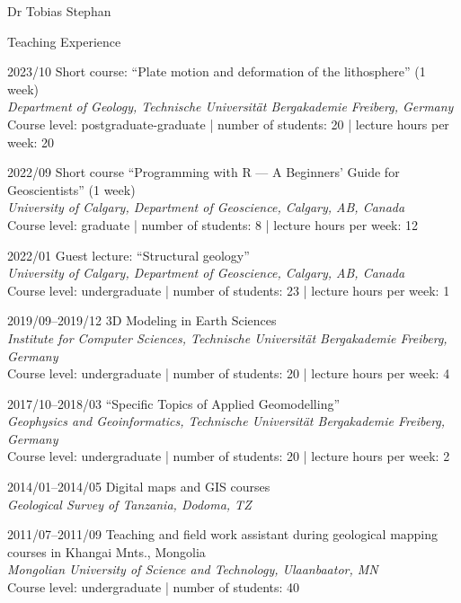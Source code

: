 \documentclass[10pt, paper=letter]{scrartcl} %
\begin{document}
\begin{cv}{Dr Tobias Stephan}
\begin{cvlist}{Teaching Experience}
    \item[2023/10] Short course: \enquote{Plate motion and deformation of the lithosphere} (1 week)\\ 
        \textit{Department of Geology, Technische Universit\"at Bergakademie Freiberg, Germany} 
        Course level: postgraduate-graduate | number of students: 20 | lecture hours per week: 20 
    \item[2022/09] Short course \enquote{Programming with R --- A Beginners’ Guide for Geoscientists} (1 week)\\
        \textit{University of Calgary, Department of Geoscience, Calgary, AB, Canada}\\
        Course level: graduate | number of students: 8 | lecture hours per week: 12 
    \item[2022/01] Guest lecture: \enquote{Structural geology}\\
        \textit{University of Calgary, Department of Geoscience, Calgary, AB, Canada}\\
        Course level: undergraduate | number of students: 23 | lecture hours per week: 1 
    \item[2019/09--2019/12] 3D Modeling in Earth Sciences\\
        \textit{Institute for Computer Sciences, Technische Universit\"at Bergakademie Freiberg, Germany}\\
        Course level: undergraduate | number of students: 20 | lecture hours per week: 4 
    \item[2017/10--2018/03] \enquote{Specific Topics of Applied Geomodelling}\\
        \textit{Geophysics and Geoinformatics, Technische Universit\"at Bergakademie Freiberg, Germany}\\
        Course level: undergraduate | number of students: 20 | lecture hours per week: 2 
    \item[2014/01--2014/05] Digital maps and GIS courses\\
        \textit{Geological Survey of Tanzania, Dodoma, TZ}
    \item[2011/07--2011/09] Teaching and field work assistant during geological mapping courses in Khangai Mnts., Mongolia\\
        \textit{Mongolian University of Science and Technology, Ulaanbaator, MN}\\
         Course level: undergraduate | number of students: 40  
\end{cvlist}


\end{cv}
\end{document}
